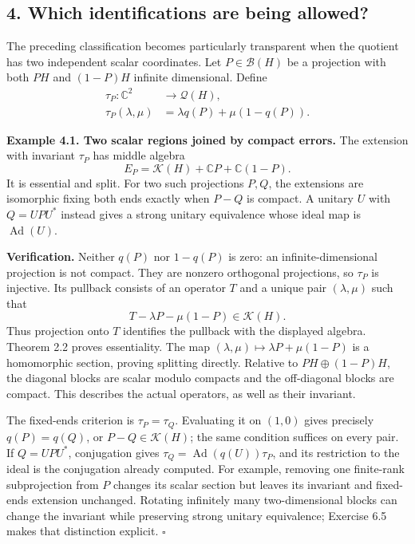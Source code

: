 \documentclass[
  11pt,
]{article}
\begin{document}
\subsection{4. Which identifications are being
allowed?}\label{which-identifications-are-being-allowed}

The preceding classification becomes particularly transparent when the
quotient has two independent scalar coordinates. Let
\(P\in\mathcal B(H)\) be a projection with both \(PH\) and \((1-P)H\)
infinite dimensional. Define \[
\begin{aligned}
\tau_P:\mathbb C^2&\longrightarrow\mathcal Q(H),\\
\tau_P(\lambda,\mu)&=\lambda q(P)+\mu(1-q(P)).
\end{aligned}
\]

\textbf{Example 4.1. Two scalar regions joined by compact errors.} The
extension with invariant \(\tau_P\) has middle algebra \[
E_P=\mathcal K(H)+\mathbb CP+\mathbb C(1-P).
\] It is essential and split. For two such projections \(P,Q\), the
extensions are isomorphic fixing both ends exactly when \(P-Q\) is
compact. A unitary \(U\) with \(Q=UPU^*\) instead gives a strong unitary
equivalence whose ideal map is \(\operatorname{Ad}(U)\).

\textbf{Verification.} Neither \(q(P)\) nor \(1-q(P)\) is zero: an
infinite-dimensional projection is not compact. They are nonzero
orthogonal projections, so \(\tau_P\) is injective. Its pullback
consists of an operator \(T\) and a unique pair \((\lambda,\mu)\) such
that \[
T-\lambda P-\mu(1-P)\in\mathcal K(H).
\] Thus projection onto \(T\) identifies the pullback with the displayed
algebra. Theorem 2.2 proves essentiality. The map
\((\lambda,\mu)\mapsto\lambda P+\mu(1-P)\) is a homomorphic section,
proving splitting directly. Relative to \(PH\oplus(1-P)H\), the diagonal
blocks are scalar modulo compacts and the off-diagonal blocks are
compact. This describes the actual operators, as well as their
invariant.

The fixed-ends criterion is \(\tau_P=\tau_Q\). Evaluating it on
\((1,0)\) gives precisely \(q(P)=q(Q)\), or \(P-Q\in\mathcal K(H)\); the
same condition suffices on every pair. If \(Q=UPU^*\), conjugation gives
\(\tau_Q=\operatorname{Ad}(q(U))\tau_P\), and its restriction to the
ideal is the conjugation already computed. For example, removing one
finite-rank subprojection from \(P\) changes its scalar section but
leaves its invariant and fixed-ends extension unchanged. Rotating
infinitely many two-dimensional blocks can change the invariant while
preserving strong unitary equivalence; Exercise 6.5 makes that
distinction explicit. \(\square\)
\end{document}
